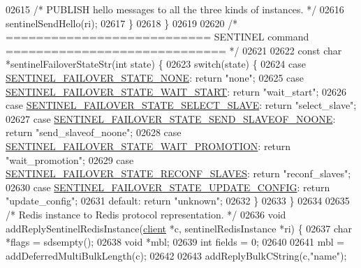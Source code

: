 \begin{DoxyCode}
{{{{{{{{{{{{{{{{{{{{{{{{{{{{{{{{{{{{{{{{{{{{{{{{{{{{{{{{{02615         \textcolor{comment}{/* PUBLISH hello messages to all the three kinds of instances. */}
02616         sentinelSendHello(ri);
02617     \}
02618 \}
02619 
02620 \textcolor{comment}{/* =========================== SENTINEL command ============================= */}
02621 
02622 \textcolor{keyword}{const} \textcolor{keywordtype}{char} *sentinelFailoverStateStr(\textcolor{keywordtype}{int} state) \{
02623     \textcolor{keywordflow}{switch}(state) \{
02624     \textcolor{keywordflow}{case} \hyperlink{sentinel_8c_a23bad5aa23e7b1a930ad4aa535938efb}{SENTINEL\_FAILOVER\_STATE\_NONE}: \textcolor{keywordflow}{return} \textcolor{stringliteral}{"none"};
02625     \textcolor{keywordflow}{case} \hyperlink{sentinel_8c_a83bf9fce7cbb7bf1b0723ced2d434366}{SENTINEL\_FAILOVER\_STATE\_WAIT\_START}: \textcolor{keywordflow}{return} \textcolor{stringliteral}{"wait\_start"};
02626     \textcolor{keywordflow}{case} \hyperlink{sentinel_8c_ab69af026a9f736ca81bfffd4eeada38f}{SENTINEL\_FAILOVER\_STATE\_SELECT\_SLAVE}: \textcolor{keywordflow}{return} \textcolor{stringliteral}{
      "select\_slave"};
02627     \textcolor{keywordflow}{case} \hyperlink{sentinel_8c_ac89d5b0fc38860b277528c7d3a854580}{SENTINEL\_FAILOVER\_STATE\_SEND\_SLAVEOF\_NOONE}: \textcolor{keywordflow}{return} \textcolor{stringliteral}{
      "send\_slaveof\_noone"};
02628     \textcolor{keywordflow}{case} \hyperlink{sentinel_8c_a49d9c64c03e76dcbf7728ad64dd99330}{SENTINEL\_FAILOVER\_STATE\_WAIT\_PROMOTION}: \textcolor{keywordflow}{return} \textcolor{stringliteral}{
      "wait\_promotion"};
02629     \textcolor{keywordflow}{case} \hyperlink{sentinel_8c_a05b020edfa71eb4d24288e79637b57f5}{SENTINEL\_FAILOVER\_STATE\_RECONF\_SLAVES}: \textcolor{keywordflow}{return} \textcolor{stringliteral}{
      "reconf\_slaves"};
02630     \textcolor{keywordflow}{case} \hyperlink{sentinel_8c_a2b6f5592dea88534b287c71e46181ed3}{SENTINEL\_FAILOVER\_STATE\_UPDATE\_CONFIG}: \textcolor{keywordflow}{return} \textcolor{stringliteral}{
      "update\_config"};
02631     \textcolor{keywordflow}{default}: \textcolor{keywordflow}{return} \textcolor{stringliteral}{"unknown"};
02632     \}
02633 \}
02634 
02635 \textcolor{comment}{/* Redis instance to Redis protocol representation. */}
02636 \textcolor{keywordtype}{void} addReplySentinelRedisInstance(\hyperlink{structclient}{client} *c, sentinelRedisInstance *ri) \{
02637     \textcolor{keywordtype}{char} *flags = sdsempty();
02638     \textcolor{keywordtype}{void} *mbl;
02639     \textcolor{keywordtype}{int} fields = 0;
02640 
02641     mbl = addDeferredMultiBulkLength(c);
02642 
02643     addReplyBulkCString(c,\textcolor{stringliteral}{"name"});
}}}}}}}}}}}}}}}}}}}}}}}}}}}}}}}}}}}}}}}}}}}}}}}}}}}}}}}}}
\end{DoxyCode}
